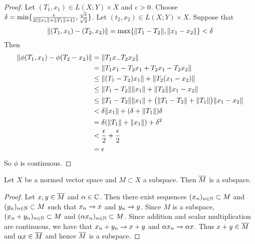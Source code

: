 \documentclass{book}
\begin{document}
	\begin{proof}
		Let $(T_1, x_1) \in L(X; Y) \times X$ and $\epsilon > 0$. Choose $\delta = \min \{\frac{\epsilon}{2(\|x_1 \|+ \|T_1 \|+1)}, \frac{\sqrt{\epsilon}}{\sqrt{2}} \}$. Let $(t_2, x_2) \in L(X; Y) \times X$. Suppose that $$\|(T_1, x_1) - (T_2, x_2) \|= \max \{\|T_1 - T_2\|, \|x_1 -x_2 \|\} < \delta$$ Then 
		\begin{align*}
			\|\phi(T_1, x_1) - \phi(T_2-x_2) \|
			&= \|T_1 x_ - T_2 x_2 \|\\
			&= \|T_1 x_1 - T_2 x_1 + T_2 x_1 - T_2 x_2 \|\\
			& \leq \|(T_1 - T_2) x_1 \|+ \|T_2(x_1 -x_2) \|\\
			& \leq \|T_1 -T_2 \|\|x_1 \|+ \|T_2 \|\|x_1 -x_2 \|\\
			& \leq \|T_1 -T_2 \|\|x_1 \|+ \big(\|T_1 - T_2 \|+ \|T_1 \|\big)\|x_1 -x_2 \|\\
			& < \delta \|x_1 \|+ (\delta + \|T_1 \|) \delta \\
			&= \delta (\|T_1 \|+ \|x_1 \|) + \delta^2\\
			& < \frac{\epsilon}{2} + \frac{\epsilon}{2}\\
			&= \epsilon
		\end{align*}
		So $\phi$ is continuous.
	\end{proof}
	
	\begin{ex} \lex{}
		Let $X$ be a normed vector space and $M \subset X$ a subspace. Then $\overline{M}$ is a subspace.
	\end{ex}
	
	\begin{proof}
		Let $x,y \in \overline{M}$ and $\alpha \in \mathbb{C}$. Then there exist sequences $(x_n)_{n \in \mathbb{N}} \subset M$ and $(y_n)_{n \in \mathbb{N}} \subset M$ such that $x_n \xrightarrow{} x$ and $y_n \xrightarrow{} y$. Since $M$ is a subspace, $(x_n +y_n)_{n \in \mathbb{N}} \subset M$ and $(\alpha x_n)_{n \in \mathbb{N}} \subset M$. Since addition and scalar multiplication are continuous, we have that $x_n + y_n \xrightarrow{} x+y$ and $\alpha x_n \xrightarrow{} \alpha x$. Thus $x+y \in \overline{M}$ and $\alpha x \in \overline{M}$ and hence $\overline{M}$ is a subspace.
	\end{proof}
	
	\newpage
	
	
	
	
	
	
	
	



	
	
	
	
	
	
\end{document}
